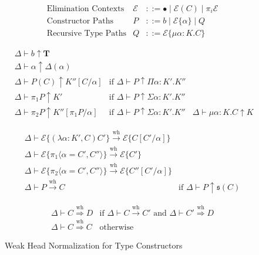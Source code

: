 \documentclass{article}
\renewcommand{\:}{\mathbin{:}}
\begin{document}
\begin{figure}
\begin{align*}
  & \text{Elimination Contexts} & \mathcal{E} & ::= \bullet \mid \mathcal{E}(C) \mid \pi_i\mathcal{E}\\
  & \text{Constructor Paths} & P & ::= b \mid \mathcal{E}\{\alpha\} \mid Q\\
  & \text{Recursive Type Paths} & Q & ::= \mathcal{E}\{\mu\alpha\: K.C\}
\end{align*}  

\begin{align*}
  & \Delta \vdash b \uparrow \textbf{T} & \\
  & \Delta \vdash \alpha \uparrow \Delta(\alpha) &\\
  & \Delta \vdash P(C) \uparrow K''[C/\alpha] & \text{if } \Delta \vdash P \uparrow \Pi\alpha \: K'.K''\\
  & \Delta \vdash \pi_1P \uparrow K' & \text{if } \Delta \vdash P \uparrow \Sigma \alpha\:K'.K''\\
  & \Delta \vdash \pi_2P \uparrow K''[\pi_1P/\alpha] & \text{if } \Delta \vdash P \uparrow \Sigma \alpha \: K' . K''
  & \Delta \vdash \mu\alpha \: K.C \uparrow K
\end{align*}  

\begin{align*}
  & \Delta \vdash \mathcal{E}\{(\lambda\alpha\:K',C)C'\} \stackrel{\text{wh}}{\longrightarrow} \mathcal{E}\{C[C'/\alpha]\} &\\
  & \Delta \vdash \mathcal{E}\{\pi_1\langle \alpha = C',C'' \rangle\} \stackrel{\text{wh}}{\longrightarrow} \mathcal{E}\{C'\} &\\
  & \Delta \vdash \mathcal{E}\{\pi_2\langle \alpha = C',C'' \rangle\} \stackrel{\text{wh}}{\longrightarrow} \mathcal{E}\{C''[C'/\alpha]\} & \\
  & \Delta \vdash P \stackrel{\text{wh}}{\longrightarrow} C & \text{if } \Delta \vdash P \uparrow \mathfrak{s}(C)
\end{align*}

\begin{align*}
  & \Delta \vdash C \stackrel{\text{wh}}{\Longrightarrow} D & \text{if } \Delta \vdash C \stackrel{\text{wh}}{\longrightarrow} C' \text{ and } \Delta \vdash C' \stackrel{\text{wh}}{\Longrightarrow} D \\
  & \Delta \vdash C \stackrel{\text{wh}}{\Longrightarrow} C & \text{otherwise}
\end{align*}
\caption{Weak Head Normalization for Type Constructors}
\end{figure}
\end{document}

